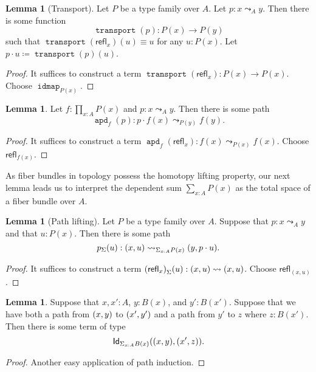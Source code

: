 \documentclass[10pt,letterpaper,cm]{nupset}
\theoremstyle{definition}
\theoremstyle{theorem}
\newtheorem{lemma}[definition]{Lemma}
\theoremstyle{remark}
\newcommand{\id}{\mathsf{Id}}
\newcommand{\refl}{\mathsf{refl}}
\newcommand{\0}{\mathbf{0}}
\newcommand{\1}{\mathbf{1}}
\newcommand{\2}{\mathbf{2}}
\DeclareMathOperator{\idmap}{\mathtt{idmap}}
\DeclareMathOperator{\transport}{\mathtt{transport}}
\DeclareMathOperator{\apd}{\mathtt{apd}}
\begin{document}
\smallskip

\begin{lemma}[Transport]
Let $P$ be a type family over $A$. Let $p: x\leadsto_A y$. Then there is some function $$\transport(p) : P(x) \to P(y)$$ such that $\transport(\refl_x)(u) \equiv u$ for any $u: P(x)$. Let $p \cdot u \coloneqq \transport(p)(u)$.
\end{lemma}
\begin{proof}
It suffices to construct a term $ \transport(\refl_x)  : P(x) \to P(x)  .$ Choose $\idmap_{P(x)}$.
\end{proof}

\begin{lemma}
Let $f: \prod_{x:A}P(x)$ and $p: x\leadsto_A y$. Then there is some path $$\apd_f(p):p \cdot f(x) \leadsto_{P(y)} f(y).$$
\end{lemma}
\begin{proof}
It suffices to construct a term $ \apd_f(\refl_x) : f(x) \leadsto_{P(x)}f(x)    .$ Choose $\refl_{f(x)}$.
\end{proof}

As fiber bundles in topology possess the homotopy lifting property,  our next lemma leads us to interpret the dependent sum $\sum_{x:A}P(x)$ as the total space of a fiber bundle over $A$.

\begin{lemma}[Path lifting]
Let $P$ be a type family over $A$. Suppose that $p: x\leadsto_A y$ and that $u: P(x)$. Then there is some path $$p_{\Sigma}(u) : \mleft(x, u\mright) \leadsto_{\Sigma_{x:A}P(x)} \mleft(y, p\cdot u\mright).$$
\end{lemma}
\begin{proof}
It suffices to construct a term $\mleft(\refl_x\mright)_{\Sigma}(u) : (x, u) \leadsto (x, u)$. Choose $\refl_{(x,u)}$.
\end{proof}



\begin{lemma}\label{noname1}
Suppose that $x, x':A$, $y :B(x)$, and $y' : B(x')$. Suppose that we have both a path from $\mleft(x,y\mright)$ to $\mleft(x', y'\mright)$ and a path from $y'$ to $z$ where $z: B(x')$. Then there is some term of type $$\id_{\Sigma_{x:A} B(x)}\mleft(\mleft(x,y\mright), \mleft(x',z\mright)\mright).$$
\end{lemma}
\begin{proof}
Another easy application of path induction. 
\end{proof}
\end{document}
